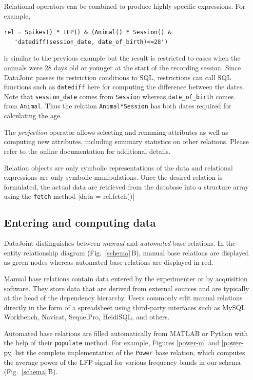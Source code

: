 \documentclass[10pt,letterpaper]{article}
\newcommand{\matlab}[1]{\texttt{#1}}
\begin{document}
Relational operators can be combined to produce highly specific expressions.  
For example,
\begin{verbatim}
rel = Spikes() * LFP() & (Animal() * Session() & 
   'datediff(session_date, date_of_birth)<=28')
\end{verbatim}
is similar to the previous example but the result is restricted to cases when the animals were 28 days old or younger at the start of the recording session.
Since DataJoint passes its restriction conditions to SQL, restrictions can call SQL functions such as \matlab{datediff} here for computing the difference between the dates. 
Note that \matlab{session_date} comes from \matlab{Session} whereas \matlab{date_of_birth} comes from \matlab{Animal}. 
Thus the relation \matlab{Animal*Session} has both dates required for calculating the age. 

The \emph{projection} operator allows selecting and renaming attributes as well as computing new attributes, including summary statistics on other relations.  Please refer to the online documentation for additional details.

Relation objects are only symbolic representations of the data and relational expressions are only symbolic manipulations.
Once the desired relation is formulated, the actual data are retrieved from the database into a structure array using the \matlab{fetch} method
|data = rel.fetch()|

\subsection*{Entering and computing data}
DataJoint distinguishes between \emph{manual} and \emph{automated} base relations. 
In the entity relationship diagram (Fig.\ \ref{schema}\,B), manual base relations are displayed as green nodes whereas automated base relations are displayed in red.

Manual base relations contain data entered by the experimenter or by acquisition software.
They store data that are derived from external sources and are typically at the head of the dependency hierarchy.
Users commonly edit manual relations directly in the form of a spreadsheet using third-party interfaces such as MySQL Workbench, Navicat, SequelPro, HeidiSQL, and others. 

Automated base relations are filled automatically from MATLAB or Python with the help of their \matlab{populate} method. 
For example, Figures \ref{power-m} and \ref{power-py} list the complete implementation of the \matlab{Power} base relation, which computes the average power of the LFP signal for various frequency bands in our schema (Fig.\ \ref{schema}\,B).
\end{document}

